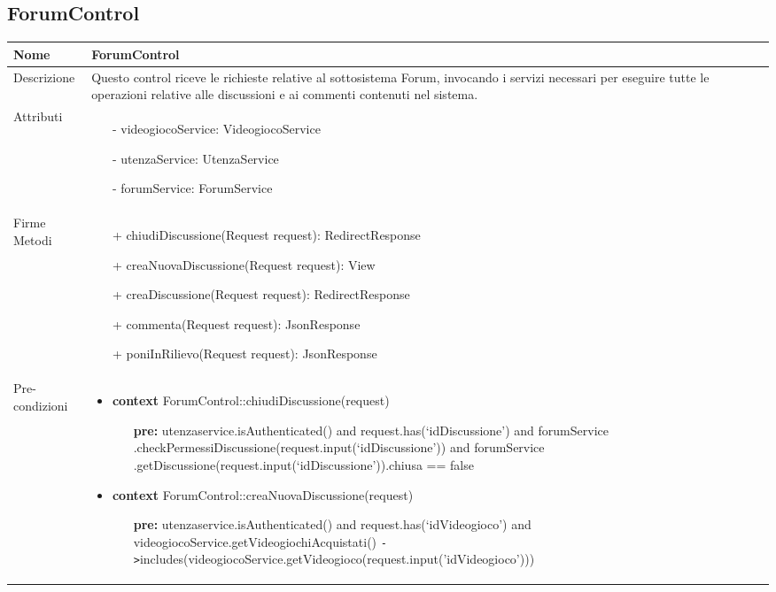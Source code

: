 \subsection{ForumControl}
\small\begin{tabular}{|| l | p{34em} ||} 
	\hline
	Nome & ForumControl\\
	\hline
	Descrizione & Questo control riceve le richieste relative al sottosistema Forum, invocando i servizi necessari per eseguire tutte le operazioni relative alle discussioni e ai commenti contenuti nel sistema. \\
	\hline
	Attributi & \begin{itemize}
		\item[-] videogiocoService: VideogiocoService
		\item[-] utenzaService: UtenzaService
		\item[-] forumService: ForumService
	\end{itemize}\\
	\hline
	Firme Metodi & \begin{itemize}
		\item[+] chiudiDiscussione(Request request): RedirectResponse
		\item[+] creaNuovaDiscussione(Request request): View
		\item[+] creaDiscussione(Request request): RedirectResponse
		\item[+] commenta(Request request): JsonResponse
		\item[+] poniInRilievo(Request request): JsonResponse
	\end{itemize}\\
	\hline
Pre-condizioni & \begin{itemize}[leftmargin=*]
	\item \textbf{context} ForumControl::chiudiDiscussione(request)
	\begin{itemize}
		\item[ ] \textbf{pre:} utenzaservice.isAuthenticated()
		and request.has(‘idDiscussione’)
		and forumService
		  .checkPermessiDiscussione(request.input(‘idDiscussione’))
		and forumService
		  .getDiscussione(request.input(‘idDiscussione’)).chiusa == false	
	\end{itemize}

	\item \textbf{context} ForumControl::creaNuovaDiscussione(request)
	\begin{itemize}
		\item[ ] \textbf{pre:} utenzaservice.isAuthenticated()
		and request.has(‘idVideogioco’)
		and videogiocoService.getVideogiochiAcquistati() \verb|->|includes(\newline videogiocoService.getVideogioco(request.input('idVideogioco')))
	\end{itemize}


\end{itemize}
\end{tabular}
